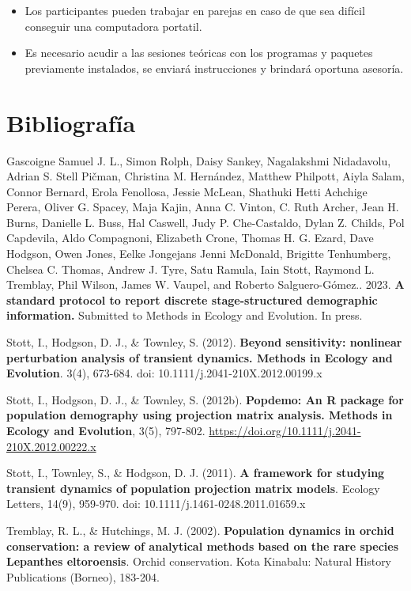 \documentclass[
]{book}
\providecommand{\tightlist}{%
  \setlength{\itemsep}{0pt}\setlength{\parskip}{0pt}}
\theoremstyle{definition}
\theoremstyle{definition}
\theoremstyle{definition}
\theoremstyle{definition}
\theoremstyle{remark}
\begin{document}
\begin{itemize}
\tightlist
\item
  Los participantes pueden trabajar en parejas en caso de que sea
  difícil conseguir una computadora portatil.\\
\item
  Es necesario acudir a las sesiones teóricas con los programas y
  paquetes previamente instalados, se enviará instrucciones y brindará
  oportuna asesoría.
\end{itemize}

\hypertarget{bibliografuxeda}{%
\section{Bibliografía}\label{bibliografuxeda}}

Gascoigne Samuel J. L., Simon Rolph, Daisy Sankey, Nagalakshmi
Nidadavolu, Adrian S. Stell Pičman, Christina M. Hernández, Matthew
Philpott, Aiyla Salam, Connor Bernard, Erola Fenollosa, Jessie McLean,
Shathuki Hetti Achchige Perera, Oliver G. Spacey, Maja Kajin, Anna C.
Vinton, C. Ruth Archer, Jean H. Burns, Danielle L. Buss, Hal Caswell,
Judy P. Che-Castaldo, Dylan Z. Childs, Pol Capdevila, Aldo Compagnoni,
Elizabeth Crone, Thomas H. G. Ezard, Dave Hodgson, Owen Jones, Eelke
Jongejans Jenni McDonald, Brigitte Tenhumberg, Chelsea C. Thomas, Andrew
J. Tyre, Satu Ramula, Iain Stott, Raymond L. Tremblay, Phil Wilson,
James W. Vaupel, and Roberto Salguero-Gómez.. 2023. \textbf{A standard
protocol to report discrete stage-structured demographic information.}
Submitted to Methods in Ecology and Evolution. In press.

Stott, I., Hodgson, D. J., \& Townley, S. (2012). \textbf{Beyond sensitivity:
nonlinear perturbation analysis of transient dynamics. Methods in
Ecology and Evolution}. 3(4), 673-684. doi:
10.1111/j.2041-210X.2012.00199.x

Stott, I., Hodgson, D. J., \& Townley, S. (2012b). \textbf{Popdemo: An R
package for population demography using projection matrix analysis.
Methods in Ecology and Evolution}, 3(5), 797-802.
\url{https://doi.org/10.1111/j.2041-210X.2012.00222.x}

Stott, I., Townley, S., \& Hodgson, D. J. (2011). \textbf{A framework for
studying transient dynamics of population projection matrix models}.
Ecology Letters, 14(9), 959-970. doi: 10.1111/j.1461-0248.2011.01659.x

Tremblay, R. L., \& Hutchings, M. J. (2002). \textbf{Population dynamics in
orchid conservation: a review of analytical methods based on the rare
species Lepanthes eltoroensis}. Orchid conservation. Kota Kinabalu:
Natural History Publications (Borneo), 183-204.
\end{document}
